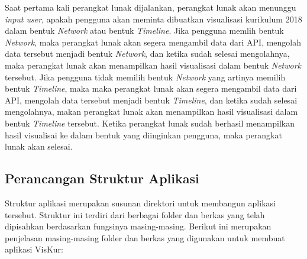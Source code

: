 \newpage
Saat pertama kali perangkat lunak dijalankan, perangkat lunak akan menunggu \textit{input user}, apakah pengguna akan meminta dibuatkan visualisasi kurikulum 2018 dalam bentuk \textit{Network} atau bentuk \textit{Timeline}. Jika pengguna memlih bentuk \textit{Network}, maka perangkat lunak akan segera mengambil data dari API, mengolah data tersebut menjadi bentuk \textit{Network}, dan ketika sudah selesai mengolahnya, maka perangkat lunak akan menampilkan hasil visualisasi dalam bentuk \textit{Network} tersebut. Jika pengguna tidak memilih bentuk \textit{Network} yang artinya memilih bentuk \textit{Timeline}, maka maka perangkat lunak akan segera mengambil data dari API, mengolah data tersebut menjadi bentuk \textit{Timeline}, dan ketika sudah selesai mengolahnya, makan perangkat lunak akan menampilkan hasil visualisasi dalam bentuk \textit{Timeline} tersebut. Ketika perangkat lunak sudah berhasil menampilkan hasil visualisai ke dalam bentuk yang diinginkan pengguna, maka perangkat lunak akan selesai.

\subsection{Perancangan Struktur Aplikasi}

Struktur aplikasi merupakan susunan direktori untuk membangun aplikasi tersebut. Struktur ini terdiri dari
berbagai folder dan berkas yang telah dipisahkan berdasarkan fungsinya masing-masing. Berikut ini merupakan penjelasan masing-masing folder dan berkas yang digunakan untuk membuat aplikasi VisKur:

